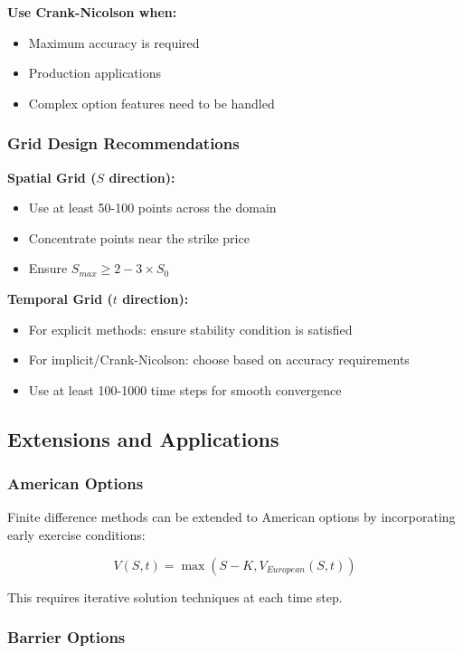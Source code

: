 \documentclass[12pt,a4paper]{article}
\numberwithin{algorithm}{subsection}
\begin{document}
\textbf{Use Crank-Nicolson when:}
\begin{itemize}
\item Maximum accuracy is required
\item Production applications
\item Complex option features need to be handled
\end{itemize}

\subsubsection{Grid Design Recommendations}

\textbf{Spatial Grid ($S$ direction):}
\begin{itemize}
\item Use at least 50-100 points across the domain
\item Concentrate points near the strike price
\item Ensure $S_{max} \geq 2-3 \times S_0$
\end{itemize}

\textbf{Temporal Grid ($t$ direction):}
\begin{itemize}
\item For explicit methods: ensure stability condition is satisfied
\item For implicit/Crank-Nicolson: choose based on accuracy requirements
\item Use at least 100-1000 time steps for smooth convergence
\end{itemize}

\subsection{Extensions and Applications}

\subsubsection{American Options}

Finite difference methods can be extended to American options by incorporating early exercise conditions:

\begin{equation}
V(S,t) = \max(S - K, V_{European}(S,t))
\end{equation}

This requires iterative solution techniques at each time step.

\subsubsection{Barrier Options}
\end{document}
